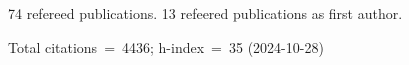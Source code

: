 74 refereed publications. 13 refeered publications as first author.

Total citations~=~4436; h-index~=~35 (2024-10-28)